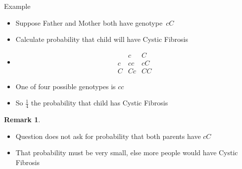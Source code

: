 \documentclass[handout]{beamer}
\theoremstyle{definition}
\newtheorem{remark}{Remark}
\begin{document}
\begin{frame}{Example}
\begin{itemize}
\item Suppose Father and Mother both have genotype~$cC$
\item Calculate probability that child will have Cystic Fibrosis
\item[]
\[\begin{array}{c|cc}
&c&C\\\hline
c&cc&cC\\
C&Cc&CC
\end{array}\]
\item One of four possible genotypes is $cc$
\item So $\frac{1}{4}$ the probability that child has Cystic Fibrosis
\end{itemize}
\begin{remark}
\begin{itemize}
\item Question does \alert{not} ask for probability that
both parents have $cC$
\item That probability must be very small, else more
people would have Cystic Fibrosis
\end{itemize}
\end{remark}
\end{frame}
\end{document}
